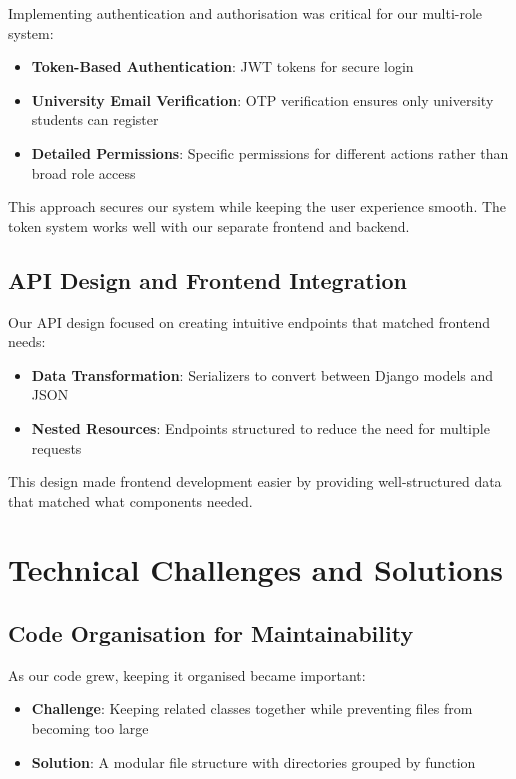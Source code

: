 Implementing authentication and authorisation was critical for our multi-role system:

\begin{itemize}
    \item \textbf{Token-Based Authentication}: JWT tokens for secure login
    \item \textbf{University Email Verification}: OTP verification ensures only university students can register
    \item \textbf{Detailed Permissions}: Specific permissions for different actions rather than broad role access
\end{itemize}

This approach secures our system while keeping the user experience smooth. The token system works well with our separate frontend and backend.

\subsection{API Design and Frontend Integration}

Our API design focused on creating intuitive endpoints that matched frontend needs:

\begin{itemize}
    \item \textbf{Data Transformation}: Serializers to convert between Django models and JSON
    \item \textbf{Nested Resources}: Endpoints structured to reduce the need for multiple requests
\end{itemize}

This design made frontend development easier by providing well-structured data that matched what components needed.

\section{Technical Challenges and Solutions}

\subsection{Code Organisation for Maintainability}

As our code grew, keeping it organised became important:

\begin{itemize}
    \item \textbf{Challenge}: Keeping related classes together while preventing files from becoming too large
    \item \textbf{Solution}: A modular file structure with directories grouped by function
\end{itemize}

